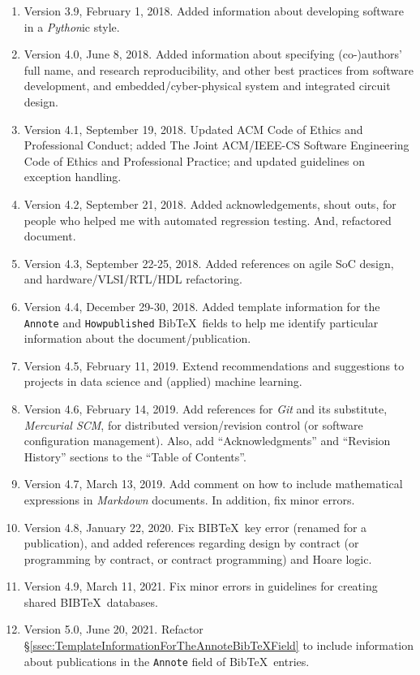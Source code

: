 \documentclass[letter,12pt]{article}
\begin{document}
\begin{enumerate}
\item Version 3.9, February 1, 2018. Added information about developing software in a {\it Python}ic style.
\item Version 4.0, June 8, 2018. Added information about specifying (co-)authors' full name, and research reproducibility, and other best practices from software development, and embedded/cyber-physical system and integrated circuit design.
\item Version 4.1, September 19, 2018. Updated ACM Code of Ethics and Professional Conduct; added The Joint {ACM/IEEE-CS} Software Engineering Code of Ethics and Professional Practice; and updated guidelines on exception handling.
\item Version 4.2, September 21, 2018. Added acknowledgements, shout outs, for people who helped me with automated regression testing. And, refactored document.
\item Version 4.3, September 22-25, 2018. Added references on agile SoC design, and hardware/VLSI/RTL/HDL refactoring.
\item Version 4.4, December 29-30, 2018. Added template information for the {\tt Annote} and {\tt Howpublished} {\sc Bib}\TeX\ fields to help me identify particular information about the document/publication.
\item Version 4.5, February 11, 2019. Extend recommendations and suggestions to projects in data science and (applied) machine learning.
\item Version 4.6, February 14, 2019. Add references for {\it Git} and its substitute, {\it Mercurial SCM}, for distributed version/revision control (or software configuration management). Also, add ``Acknowledgments'' and ``Revision History'' sections to the ``Table of Contents''.
\item Version 4.7, March 13, 2019. Add comment on how to include mathematical expressions in {\it Markdown} documents. In addition, fix minor errors.
\item Version 4.8, January 22, 2020. Fix B{\scriptsize IB}\TeX\ key error (renamed for a publication), and added references regarding design by contract (or programming by contract, or contract programming) and Hoare logic.
\item Version 4.9, March 11, 2021. Fix minor errors in guidelines for creating shared B{\scriptsize IB}\TeX\ databases.
\item Version 5.0, June 20, 2021. Refactor \S\ref{ssec:TemplateInformationForTheAnnoteBibTeXField} to include information about publications in the {\tt Annote} field of {\sc Bib}\TeX\ entries.
\end{enumerate}
\end{document}
